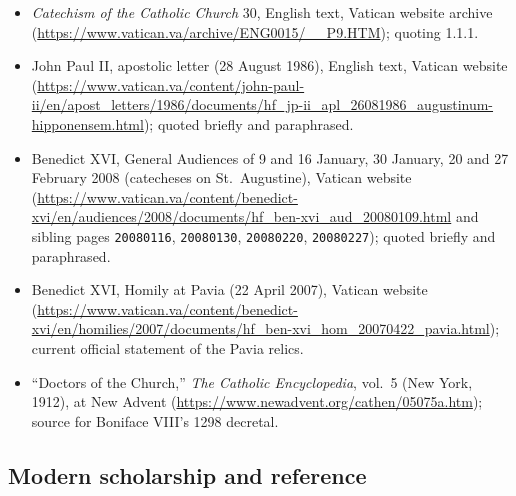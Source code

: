 \begin{itemize}
\item \textit{Catechism of the Catholic Church} 30, English text, Vatican
website archive (\url{https://www.vatican.va/archive/ENG0015/__P9.HTM});
quoting  1.1.1.
\item John Paul II, apostolic letter  (28
August 1986), English text, Vatican website
(\url{https://www.vatican.va/content/john-paul-ii/en/apost_letters/1986/documents/hf_jp-ii_apl_26081986_augustinum-hipponensem.html});
quoted briefly and paraphrased.
\item Benedict XVI, General Audiences of 9 and 16 January, 30 January, 20
and 27 February 2008 (catecheses on St.~Augustine), Vatican website
(\url{https://www.vatican.va/content/benedict-xvi/en/audiences/2008/documents/hf_ben-xvi_aud_20080109.html}
and sibling pages \texttt{20080116}, \texttt{20080130}, \texttt{20080220},
\texttt{20080227}); quoted briefly and paraphrased.
\item Benedict XVI, Homily at Pavia (22 April 2007), Vatican website
(\url{https://www.vatican.va/content/benedict-xvi/en/homilies/2007/documents/hf_ben-xvi_hom_20070422_pavia.html});
current official statement of the Pavia relics.
\item ``Doctors of the Church,'' \textit{The Catholic Encyclopedia},
vol.~5 (New York, 1912), at New Advent
(\url{https://www.newadvent.org/cathen/05075a.htm}); source for Boniface
VIII's 1298 decretal.
\end{itemize}

\subsection*{Modern scholarship and reference}

